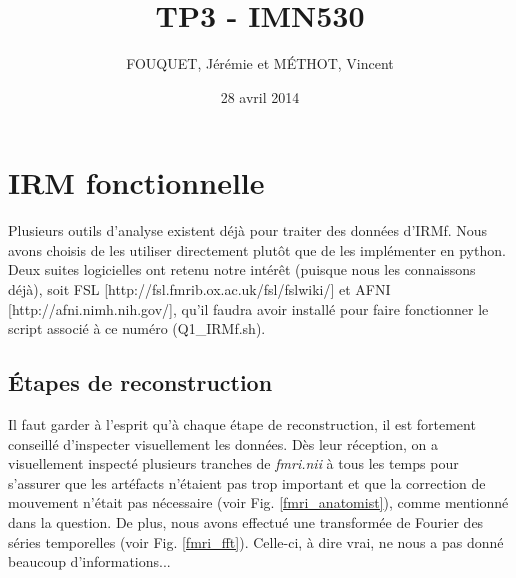 \documentclass[a4paper]{article}
\title{TP3 - IMN530}
\author{FOUQUET, Jérémie et MÉTHOT, Vincent}
\date{28 avril 2014}
\begin{document}
\maketitle

\section{IRM fonctionnelle}

Plusieurs outils d'analyse existent déjà pour traiter des données d'IRMf. Nous avons choisis de les utiliser directement plutôt que de les implémenter en python. Deux suites logicielles ont retenu notre intérêt (puisque nous les connaissons déjà), soit FSL [http://fsl.fmrib.ox.ac.uk/fsl/fslwiki/] et AFNI [http://afni.nimh.nih.gov/], qu'il faudra avoir installé pour faire fonctionner le script associé à ce numéro (Q1\_IRMf.sh).

\subsection{Étapes de reconstruction}

Il faut garder à l'esprit qu'à chaque étape de reconstruction, il est fortement conseillé d'inspecter visuellement les données. Dès leur réception, on a visuellement inspecté plusieurs tranches de \emph{fmri.nii} à tous les temps pour s'assurer que les artéfacts n'étaient pas trop important et que la correction de mouvement n'était pas nécessaire (voir Fig. \ref{fmri_anatomist}), comme mentionné dans la question. De plus, nous avons effectué une transformée de Fourier des séries temporelles (voir Fig. \ref{fmri_fft}). Celle-ci, à dire vrai, ne nous a pas donné beaucoup d'informations...
\end{document}
